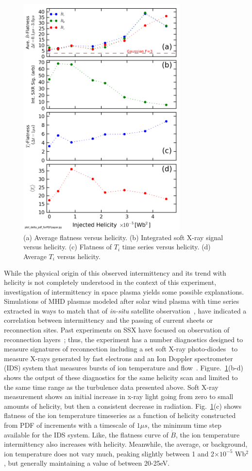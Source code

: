 \documentclass[aps,prl,amsmath,amssymb,reprint,superscriptaddress]{revtex4-1} %
\begin{document}
\begin{figure}[!htbp]
\centerline{
\includegraphics[width=8.5cm]{flatness_scaling.png}}
\caption{\label{fig:flatness_scaling} (a) Average flatness versus helicity. (b) Integrated soft X-ray signal versus helicity. (c) Flatness of $T_{i}$ time series versus helicity. (d) Average $T_{i}$ versus helicity.}
\end{figure}

While the physical origin of this observed intermittency and its trend with helicity is not completely understood in the context of this experiment, investigation of intermittency in space plasma yields some possible explanations. Simulations of MHD plasmas modeled after solar wind plasma with time series extracted in ways to match that of \textit{in-situ} satellite observation~\cite{Greco08,Greco09}, have indicated a correlation between intermittency and the passing of current sheets or reconnection sites. Past experiments on SSX have focused on observation of reconnection layers~\cite{Gray10,brown12}; thus, the experiment has a number diagnostics designed to measure signatures of reconnection including a set soft X-ray photo-diodes~\cite{chaplin09} to measure X-rays generated by fast electrons and an Ion Doppler spectrometer (IDS) system that measures bursts of ion temperature and flow~\cite{brown12}. Figure.~\ref{fig:flatness_scaling}(b-d) shows the output of these diagnostics for the same helicity scan and limited to the same time range as the turbulence data presented above. Soft X-ray measurement shows an initial increase in x-ray light going from zero to small amounts of helicity, but then a consistent decrease in radiation. Fig.~\ref{fig:flatness_scaling}(c) shows flatness of the ion temperature timeseries as a function of helicity constructed from PDF of increments with a timescale of $1\mu s$, the minimum time step available for the IDS system. Like, the flatness curve of $\dot{B}$, the ion temperature intermittency also increases with helicity. Meanwhile, the average, or background, ion temperature does not vary much, peaking slightly between 1 and 2$\times 10^{-5}$ Wb$^{2}$, but generally maintaining a value of between 20-25eV. 
\end{document}
